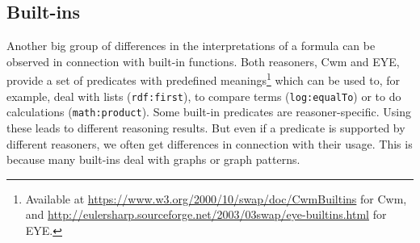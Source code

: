 % 
% 
\subsection{Built-ins}
%  
Another big group of differences in the interpretations of a formula can be observed in connection with built-in functions.
Both reasoners, Cwm and EYE, provide 
a set of predicates with predefined meanings\footnote{Available at  \url{https://www.w3.org/2000/10/swap/doc/CwmBuiltins} for Cwm, and 
\url{http://eulersharp.sourceforge.net/2003/03swap/eye-builtins.html} for EYE.}
which can be used to, for example, deal with lists (\texttt{rdf:first}), to compare terms (\texttt{log:equalTo}) or to do calculations (\texttt{math:product}). 
Some built-in predicates are reasoner-specific. Using these leads to different reasoning results. %
But even if a
predicate is supported by different reasoners, we often get differences in connection with their usage.
This is because many built-ins deal with graphs or graph patterns. %


